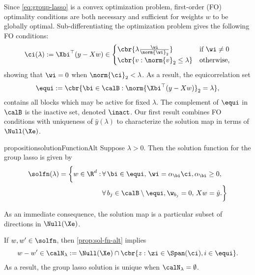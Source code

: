 Since \cref{eq:group-lasso} is a convex optimization problem, first-order (FO)
optimality conditions are both necessary and sufficient for weights \( w \)
to be globally optimal.
Sub-differentiating the optimization problem gives the following FO conditions:
\begin{equation}\label{eq:fo-optimality}
	\begin{aligned}
		\ci(\lambda) := \Xbi^\top (y - X w) \in
		\begin{cases}
			\cbr{\lambda \frac{\wi}{\norm{\wi}_2}} & \mbox{if \( \wi \neq 0 \)} \\
			\cbr{v : \norm{v}_2 \leq \lambda }     & \mbox{otherwise,}
		\end{cases}
	\end{aligned}
\end{equation}
showing that \( \wi = 0 \) when \( \norm{\ci}_2 < \lambda \).
As a result, the equicorrelation set
\begin{equation}\label{eq:equi}
	\equi := \cbr{\bi \in \calB : \norm{\Xbi^\top (y - Xw)}_2 = \lambda},
\end{equation}
contains all blocks which may be active for fixed \( \lambda \).
The complement of \( \equi \) in \( \calB \) is the inactive set,
denoted \( \inact \).
Our first result combines FO conditions with uniqueness of \( \hat y(\lambda) \)
to characterize the solution map in terms of \( \Null(\Xe) \).
\begin{restatable}{proposition}{solutionFunctionAlt}\label{prop:sol-fn-alt}
	Suppose \( \lambda > 0 \).
	Then the solution function for the group lasso is given by
	\begin{equation}
		\begin{aligned}
			\solfn(\lambda) =
			\bigg\{ w \in \R^d : \,
			 & \forall \, \bi \in \equi, \, \wi = \alpha_\bi \ci, \alpha_\bi \geq 0, \, \\
			 & \forall \, b_j \in \calB \setminus \equi, \w_{b_j} = 0, \,
			X w = \hat y.
			\bigg\}
		\end{aligned}
	\end{equation}
\end{restatable}
As an immediate consequence, the solution map is a particular subset
of directions in \( \Null(\Xe) \).
\begin{corollary}\label{cor:uniqueness-cond}
	If \( w, w' \in \solfn \),
	then \cref{prop:sol-fn-alt} implies
	\[
		w - w' \in \calN_\lambda := \Null(\Xe) \cap \cbr{z : \zi \in \Span(\ci), i \in \equi }.
	\]
	As a result, the group lasso solution is unique when \( \calN_\lambda = \emptyset \).
\end{corollary}
